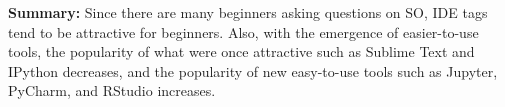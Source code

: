 \documentclass[conference]{IEEEtran}
\begin{document}



\noindent \textbf{Summary:}
Since there are many beginners asking questions on SO, IDE tags tend to be attractive for beginners. Also, with the emergence of easier-to-use tools, the popularity of what were once attractive such as Sublime Text and IPython decreases, and the popularity of new easy-to-use tools such as Jupyter, PyCharm, and RStudio increases.

\end{document}
